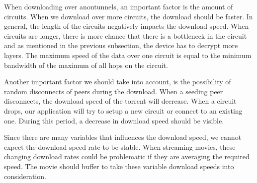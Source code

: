 		When downloading over anontunnels, an important factor is the amount of circuits. When we download over more circuits, the download should be faster. In general, the length of the circuits negatively impacts the download speed. When circuits are longer, there is more chance that there is a bottleneck in the circuit and as mentioned in the previous subsection, the device has to decrypt more layers. The maximum speed of the data over one circuit is equal to the minimum bandwidth of the maximum of all hops on the circuit.
		
		Another important factor we should take into account, is the possibility of random disconnects of peers during the download. When a seeding peer disconnects, the download speed of the torrent will decrease. When a circuit drops, our application will try to setup a new circuit or connect to an existing one. During this period, a decrease in download speed should be visible.
		
		Since there are many variables that influences the download speed, we cannot expect the download speed rate to be stable. When streaming movies, these changing download rates could be problematic if they are averaging the required speed. The movie should buffer to take these variable download speeds into consideration.